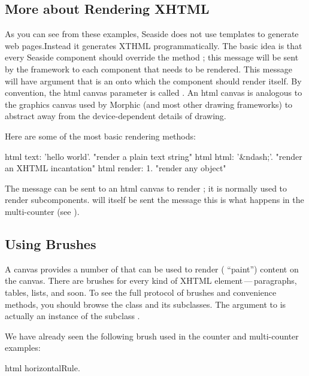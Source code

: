 \documentclass[a4paper,10pt,twoside]{book}
\begin{document}
\subsection{More about Rendering XHTML}

As you can see from these examples, Seaside does not use templates to generate web
pages.Instead it generates XTHML programmatically.
The basic idea is that every Seaside component should override the method
; this message will be sent by the framework to
each component that needs to be rendered.
This  message will have argument that is an   onto which the component should render itself. By
convention, the html canvas parameter is called .
An html canvas is analogous to the graphics canvas used by Morphic (and most other
drawing frameworks) to abstract away from the device-dependent details of drawing.
 

Here are some of the most basic rendering methods:
\begin{code}{}
html text: 'hello world'.  "render a plain text string"
html html: '&ndash;'.     "render an XHTML incantation"
html render: 1.              "render any object"
\end{code}

The message  can be sent to an html canvas to render
; it is normally used to render subcomponents.  will itself
be sent the message 
this is what happens in the multi-counter (see ).

\subsection{Using Brushes}

A canvas provides a number of  that can be used to render (\ie
``paint'') content on the canvas.
There are brushes for every kind of XHTML element\,---\,paragraphs, tables, lists, and soon.
To see the full protocol of brushes and convenience methods, you should browse the class
 and its subclasses.
The argument to  is actually an instance of the subclass
.

We have already seen the following brush used in the counter and multi-counter examples:
\begin{code}{}
html horizontalRule.
\end{code}
\end{document}
